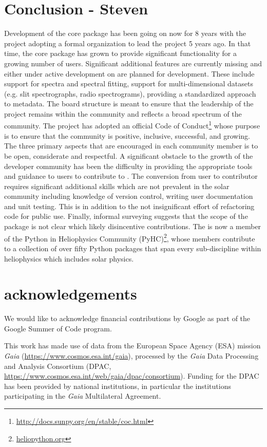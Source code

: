 \section{Conclusion - Steven}
\label{sec:conclusion}

Development of the \sunpypkg core package has been going on now for 8 years with the project adopting a formal organization to lead the project 5 years ago.
In that time, the core package has grown to provide significant functionality for a growing number of users.
Significant additional features are currently missing and either under active development on are planned for development.
These include support for spectra and spectral fitting, support for multi-dimensional datasets (e.g. slit spectrographs, radio spectrograms), providing a standardized approach to metadata.
The board structure is meant to ensure that the leadership of the project remains within the community and reflects a broad spectrum of the community.
The project has adopted an official Code of Conduct\footnote{\url{http://docs.sunpy.org/en/stable/coc.html}} whose purpose is to ensure that the \sunpy community is positive, inclusive, successful, and growing.
The three primary aspects that are encouraged in each community member is to be open, considerate and respectful.
A significant obstacle to the growth of the developer community has been the difficulty in providing the appropriate tools and guidance to users to contribute to \sunpypkg.
The conversion from user to contributor requires significant additional skills which are not prevalent in the solar community including knowledge of version control, writing user documentation and unit testing.
This is in addition to the not insignificant effort of refactoring code for public use.
Finally, informal surveying suggests that the scope of the \sunpypkg package is not clear which likely disincentive contributions.
The \sunpyproj is now a member of the Python in Heliophysics Community (PyHC)\footnote{\url{heliopython.org}}, whose members contribute to a collection of over fifty Python packages that span every sub-discipline within heliophysics which includes solar physics.

\section{acknowledgements}
We would like to acknowledge financial contributions by Google as part of the Google Summer of Code program.

This work has made use of data from the European Space Agency (ESA) mission {\it Gaia} (\url{https://www.cosmos.esa.int/gaia}), processed by the {\it Gaia} Data Processing and Analysis Consortium (DPAC, \url{https://www.cosmos.esa.int/web/gaia/dpac/consortium}).
Funding for the DPAC has been provided by national institutions, in particular the institutions participating in the {\it Gaia} Multilateral Agreement.

